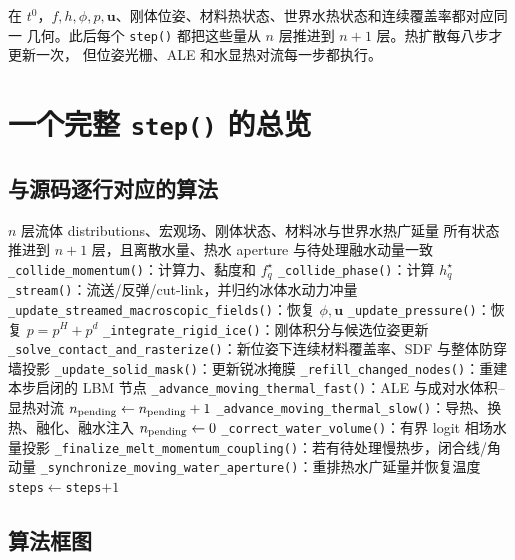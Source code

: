 \documentclass[UTF8,zihao=-4]{ctexart}
\newcommand{\vect}[1]{\boldsymbol{#1}}
\newcommand{\code}[1]{\texttt{#1}}
\numberwithin{equation}{section}
\begin{document}
在 $t^0$，$f,h,\phi,p,\vect u$、刚体位姿、材料热状态、世界水热状态和连续覆盖率都对应同一
几何。此后每个 \code{step()} 都把这些量从 $n$ 层推进到 $n+1$ 层。热扩散每八步才更新一次，
但位姿光栅、ALE 和水显热对流每一步都执行。

\section{一个完整 \code{step()} 的总览}

\subsection{与源码逐行对应的算法}

\begin{algorithm}[H]
\caption{一个 LBM 时间步的真实调度顺序}
\label{alg:step}
\small
\begin{algorithmic}[1]
\Require $n$ 层流体 distributions、宏观场、刚体状态、材料冰与世界水热广延量
\Ensure 所有状态推进到 $n+1$ 层，且离散水量、热水 aperture 与待处理融水动量一致
\State \code{\_collide\_momentum()}：计算力、黏度和 $f_q^\star$
\State \code{\_collide\_phase()}：计算 $h_q^\star$
\State \code{\_stream()}：流送/反弹/cut-link，并归约冰体水动力冲量
\State \code{\_update\_streamed\_macroscopic\_fields()}：恢复 $\phi,\vect u$
\State \code{\_update\_pressure()}：恢复 $p=p^H+p^d$
\State \code{\_integrate\_rigid\_ice()}：刚体积分与候选位姿更新
\State \code{\_solve\_contact\_and\_rasterize()}：新位姿下连续材料覆盖率、SDF 与整体防穿墙投影
\State \code{\_update\_solid\_mask()}：更新锐冰掩膜
\State \code{\_refill\_changed\_nodes()}：重建本步启闭的 LBM 节点
\State \code{\_advance\_moving\_thermal\_fast()}：ALE 与成对水体积--显热对流
\State $n_{\rm pending}\gets n_{\rm pending}+1$
  \State \code{\_advance\_moving\_thermal\_slow()}：导热、换热、融化、融水注入
  \State $n_{\rm pending}\gets0$
\EndIf
\State \code{\_correct\_water\_volume()}：有界 logit 相场水量投影
\State \code{\_finalize\_melt\_momentum\_coupling()}：若有待处理慢热步，闭合线/角动量
\State \code{\_synchronize\_moving\_water\_aperture()}：重排热水广延量并恢复温度
\State \code{steps}$\gets$\code{steps}$+1$
\end{algorithmic}
\end{algorithm}

\subsection{算法框图}
\end{document}
